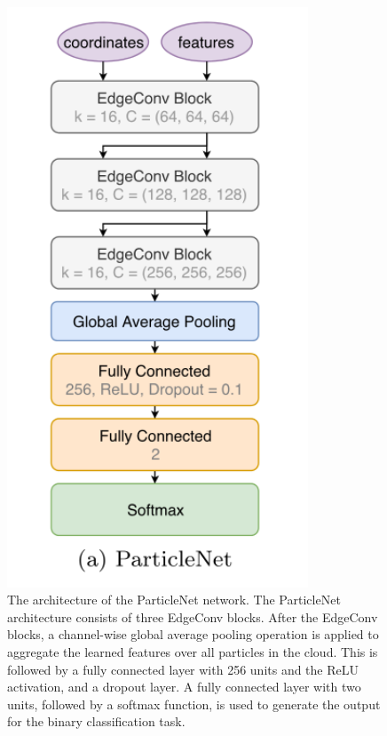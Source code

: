 \documentclass[letterpaper,12pt]{article}
\begin{document}
\begin{spacing}{1.125}
\begin{figure}[H]
\begin{minipage}{0.48\textwidth}
        \includegraphics[width=0.8\textwidth]{particleNet.png}
        \caption[architecture of EdgeConv block in ParticleNet]{The architecture of the ParticleNet network. The ParticleNet architecture consists of three EdgeConv blocks. After the EdgeConv blocks, a channel-wise global average pooling operation is applied to aggregate the learned features over all particles in the cloud. This is followed by a fully connected layer with 256 units and the ReLU activation, and a dropout layer. A fully connected layer with two units, followed by a softmax function, is used to generate the output for the binary classification task.}
    \end{minipage}
\end{figure}


\end{spacing}
\end{document}
